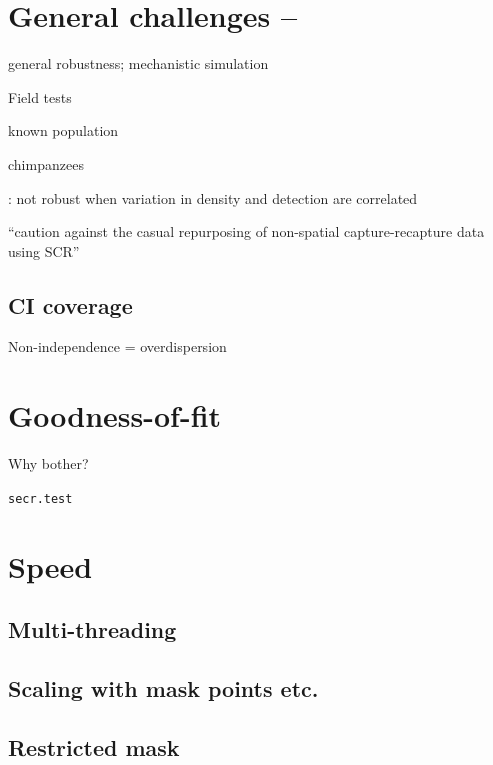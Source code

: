 \documentclass[
]{book}
\begin{document}
\section{General challenges --}\label{general-challenges}

\citet{Theng2022} general robustness; mechanistic simulation

Field tests

\citet{Gerber2015} known population

\citet{DespresEinspenner2017} chimpanzees

\citet{McLellan2023}: not robust when variation in density and detection are correlated

\citet{Smith2020} ``caution against the casual repurposing of non-spatial
capture-recapture data using SCR''

\subsection{CI coverage}\label{ci-coverage}

Non-independence = overdispersion

\section{Goodness-of-fit}\label{goodness-of-fit}

Why bother?

\texttt{secr.test}

\section{Speed}\label{speed}

\subsection{Multi-threading}\label{multi-threading}

\subsection{Scaling with mask points etc.}\label{scaling-with-mask-points-etc.}

\subsection{Restricted mask}\label{restricted-mask}

\citet{Turek2021}
\end{document}
